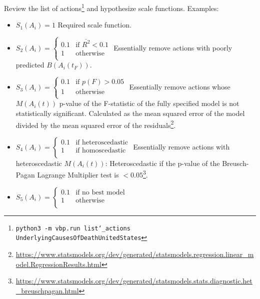 \documentclass[12pt, a4paper, twocolumn]{article}
\begin{document}
Review the list of actions\footnote{\texttt{python3 -m vbp.run list\char`_actions UnderlyingCausesOfDeathUnitedStates}} and hypothesize scale functions. Examples:

\begin{itemize}
\item $S_1(A_i) = 1$
                \newline\newline
                Required scale function.
\item $S_2(A_i) = \begin{cases}\text{0.1} & \mbox{if } \bar{R^2} < 0.1 \\ \text{1} & \mbox{otherwise} \\ \end{cases}$
                \newline\newline
                Essentially remove actions with poorly predicted $B(A_i(t_F))$.
\item $S_3(A_i) = \begin{cases}\text{0.1} & \mbox{if } p(F) > 0.05 \\ \text{1} & \mbox{otherwise} \\ \end{cases}$
                \newline\newline
                Essentially remove actions whose $M(A_i(t))$ p-value of the F-statistic of the fully specified model is not statistically significant. Calculated as the mean squared error of the model divided by the mean squared error of the residuals\footnote{\url{https://www.statsmodels.org/dev/generated/statsmodels.regression.linear_model.RegressionResults.html}}.
\item $S_4(A_i) = \begin{cases}\text{0.1} & \mbox{if heteroscedastic} \\ \text{1} & \mbox{if homoscedastic} \\ \end{cases}$
                \newline\newline
                Essentially remove actions with heteroscedastic $M(A_i(t))$: Heteroscedastic if the p-value of the Breusch-Pagan Lagrange Multiplier test is $< 0.05$\footnote{\url{https://www.statsmodels.org/dev/generated/statsmodels.stats.diagnostic.het_breuschpagan.html}}.
\item $S_5(A_i) = \begin{cases}\text{0.1} & \mbox{if no best model} \\ \text{1} & \mbox{otherwise} \\ \end{cases}$

\end{itemize}
\end{document}

